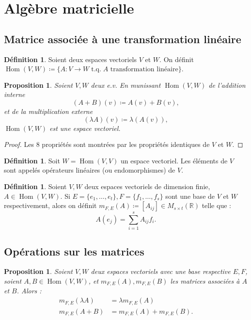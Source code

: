\documentclass{article}
\DeclareMathOperator{\tq}{\text{ t.q. }}
\DeclareMathOperator{\Hom}{Hom}
\newcommand{\R}{\mathbb R}
\newcommand{\M}[3]{M_{#1 \times #2}(#3)}
\newtheorem{prp}[thm]{Proposition}
\theoremstyle{definition}
\newtheorem{déf}[thm]{Définition}
\theoremstyle{remark}
\begin{document}
\section{Algèbre matricielle}
	\subsection{Matrice associée à une transformation linéaire}
		\begin{déf} Soient deux espaces vectoriels $V$ et $W$. On définit $\Hom(V, W) \coloneqq \{A : V \to W \tq A \text { transformation linéaire}\}$. \end{déf}

		\begin{prp} Soient $V, W$ deux e.v. En munissant $\Hom(V, W)$ de l'addition interne \[(A+B)(v) \coloneqq A(v) + B(v),\] et de la multiplication externe
		\[(\lambda A)(v) \coloneqq \lambda(A(v)),\] $\Hom(V, W)$ est une espace vectoriel. \end{prp}

		\begin{proof} Les 8 propriétés sont montrées par les propriétés identiques de $V$ et $W$. \end{proof}

		\begin{déf} Soit $W = \Hom(V, V)$ un espace vectoriel. Les éléments de $V$ sont appelés opérateurs linéaires (ou endomorphismes) de $V$. \end{déf}

		\begin{déf} Soient $V, W$ deux espaces vectoriels de dimension finie, $A \in \Hom(V, W)$. Si $E = \{e_1, \ldots, e_t\}, F = \{f_1, \ldots, f_s\}$ sont une base de $V$
		et $W$ respectivement, alors on définit $m_{F, E}(A) \coloneqq [A_{ij}] \in \M st\R$ telle que : \[A(e_j) = \sum_{i=1}^sA_{ij}f_i.\] \end{déf}
	
	\subsection{Opérations sur les matrices}
		\begin{prp}\label{linéaritéMatrices} Soient $V, W$ deux espaces vectoriels avec une base respective $E, F$, soient $A, B \in \Hom(V, W)$,
		et $m_{F, E}(A), m_{F, E}(B)$ les matrices associées à $A$ et $B$. Alors :
		\begin{align*}
			m_{F, E}(\lambda A) &= \lambda m_{F, E}(A) \\
			m_{F, E}(A + B) &= m_{F, E}(A) + m_{F, E}(B).
		\end{align*}
		\end{prp}
\end{document}
